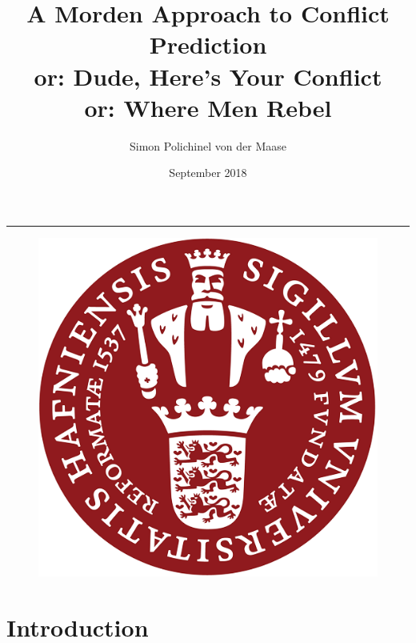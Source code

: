 \documentclass[a4paper]{article}
\title{A Morden Approach to Conflict Prediction\\or: Dude, Here's Your Conflict\\ or: Where Men Rebel}
\author{Simon Polichinel von der Maase}
\date{September 2018}
\begin{document}
	\begin{titlepage}
		\maketitle
		\noindent\rule{\linewidth}{0.4pt}
		\begin{figure}[h]
			\centering
			\includegraphics[scale=0.32]{KU_logo.png}
		\end{figure}
		\thispagestyle{empty} %
	\end{titlepage}
    \tableofcontents
\pagebreak

\begin{abstract}
\end{abstract}
\pagebreak

\section{Introduction}
\end{document}
